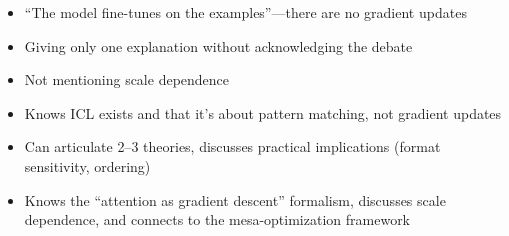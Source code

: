 \begin{interviewq}
\redflags
\begin{itemize}
    \item ``The model fine-tunes on the examples''---there are no gradient updates
    \item Giving only one explanation without acknowledging the debate
    \item Not mentioning scale dependence
\end{itemize}


\goodgreat
\begin{itemize}
    \item {} Knows ICL exists and that it's about pattern matching, not gradient updates
    \item {} Can articulate 2--3 theories, discusses practical implications (format sensitivity, ordering)
    \item {} Knows the ``attention as gradient descent'' formalism, discusses scale dependence, and connects to the mesa-optimization framework
\end{itemize}

\end{interviewq}

